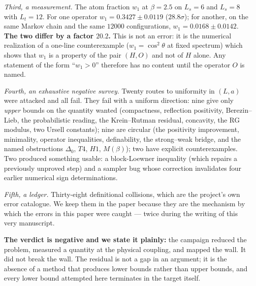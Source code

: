 \documentclass[11pt,a4paper]{article}
\begin{document}
\emph{Third, a measurement.} The atom fraction $w_1$ at $\beta = 2.5$ on $L_s = 6$ and $L_s = 8$ with
$L_t = 12$. For one operator $w_1 = 0.3427 \pm 0.0119$ ($28.8\sigma$); for another, on the same Markov
chain and the same $12000$ configurations, $w_1 = 0.0168 \pm 0.0142$. \textbf{The two differ by a
factor $20.2$.} This is not an error: it is the numerical realization of a one-line counterexample
($w_1 = \cos^2\theta$ at fixed spectrum) which shows that $w_1$ is a property of the pair $(H,O)$ and
not of $H$ alone. Any statement of the form ``$w_1 > 0$'' therefore has no content until the operator
$O$ is named.

\emph{Fourth, an exhaustive negative survey.} Twenty routes to uniformity in $(L, a)$ were attacked and
all fail. They fail with a uniform direction: nine give only \emph{upper} bounds on the quantity wanted
(compactness, reflection positivity, Berezin--Lieb, the probabilistic reading, the Krein--Rutman
residual, concavity, the RG modulus, two Ursell constants); nine are circular (the positivity
improvement, minimality, operator inequalities, definability, the strong--weak bridge, and the named
obstructions $\Delta_0$, $T4$, $H1$, $M(\beta)$); two have explicit counterexamples. Two produced
something usable: a block-Loewner inequality (which repairs a previously unproved step) and a sampler
bug whose correction invalidates four earlier numerical sign determinations.

\emph{Fifth, a ledger.} Thirty-eight definitional collisions, which are the project's own error
catalogue. We keep them in the paper because they are the mechanism by which the errors in this
paper were caught --- twice during the writing of this very manuscript.

\bigskip
\noindent\textbf{The verdict is negative and we state it plainly:} the campaign reduced the problem,
measured a quantity at the physical coupling, and mapped the wall. It did not break the wall.
The residual is not a gap in an argument; it is the absence of a method that produces lower bounds
rather than upper bounds, and every lower bound attempted here terminates in the target itself.

\clearpage
\tableofcontents
\clearpage
\end{document}
